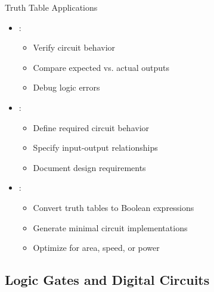 \begin{frame}{Truth Table Applications}
\begin{itemize}
\item {}:
\begin{itemize}
\item Verify circuit behavior
\item Compare expected vs. actual outputs
\item Debug logic errors
\end{itemize}
\vspace{0.5cm}
\item {}:
\begin{itemize}
\item Define required circuit behavior
\item Specify input-output relationships
\item Document design requirements
\end{itemize}
\vspace{0.5cm}
\item {}:
\begin{itemize}
\item Convert truth tables to Boolean expressions
\item Generate minimal circuit implementations
\item Optimize for area, speed, or power
\end{itemize}
\end{itemize}
\end{frame}

\subsection{Logic Gates and Digital Circuits}

